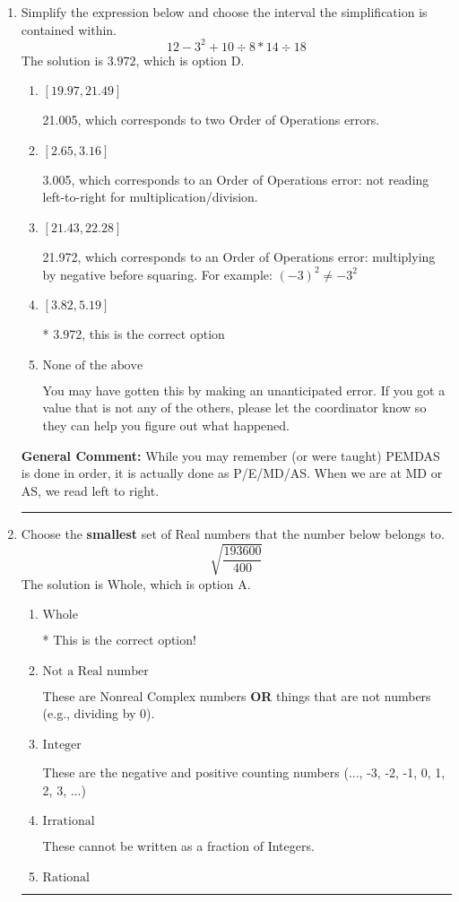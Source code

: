 \documentclass{extbook}[14pt]
\newcommand{\litem}[1]{\item #1

\rule{\textwidth}{0.4pt}}
\begin{document}
\begin{enumerate}\litem{
Simplify the expression below and choose the interval the simplification is contained within.
\[ 12 - 3^2 + 10 \div 8 * 14 \div 18 \]
The solution is \( 3.972 \), which is option D.\begin{enumerate}[label=\Alph*.]
\item \( [19.97, 21.49] \)

 21.005, which corresponds to two Order of Operations errors.
\item \( [2.65, 3.16] \)

 3.005, which corresponds to an Order of Operations error: not reading left-to-right for multiplication/division.
\item \( [21.43, 22.28] \)

 21.972, which corresponds to an Order of Operations error: multiplying by negative before squaring. For example: $(-3)^2 \neq -3^2$
\item \( [3.82, 5.19] \)

* 3.972, this is the correct option
\item \( \text{None of the above} \)

 You may have gotten this by making an unanticipated error. If you got a value that is not any of the others, please let the coordinator know so they can help you figure out what happened.
\end{enumerate}

\textbf{General Comment:} While you may remember (or were taught) PEMDAS is done in order, it is actually done as P/E/MD/AS. When we are at MD or AS, we read left to right.
}
\litem{
Choose the \textbf{smallest} set of Real numbers that the number below belongs to.
\[ \sqrt{\frac{193600}{400}} \]
The solution is \( \text{Whole} \), which is option A.\begin{enumerate}[label=\Alph*.]
\item \( \text{Whole} \)

* This is the correct option!
\item \( \text{Not a Real number} \)

These are Nonreal Complex numbers \textbf{OR} things that are not numbers (e.g., dividing by 0).
\item \( \text{Integer} \)

These are the negative and positive counting numbers (..., -3, -2, -1, 0, 1, 2, 3, ...)
\item \( \text{Irrational} \)

These cannot be written as a fraction of Integers.
\item \( \text{Rational} \)


\end{enumerate}}
\end{enumerate}
\end{document}
